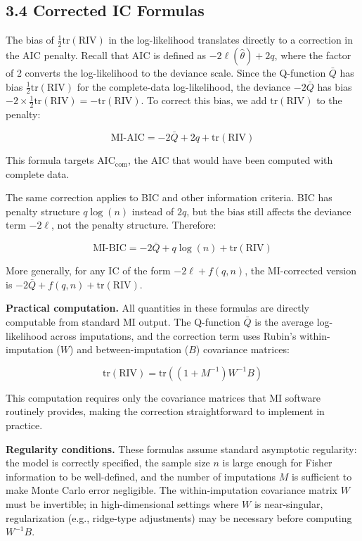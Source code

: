 \documentclass[
]{article}
\begin{document}
\subsection{3.4 Corrected IC Formulas}\label{corrected-ic-formulas}

The bias of \(\frac{1}{2}\text{tr}(\text{RIV})\) in the log-likelihood
translates directly to a correction in the AIC penalty. Recall that AIC
is defined as \(-2\ell(\hat{\theta}) + 2q\), where the factor of 2
converts the log-likelihood to the deviance scale. Since the Q-function
\(\bar{Q}\) has bias \(\frac{1}{2}\text{tr}(\text{RIV})\) for the
complete-data log-likelihood, the deviance \(-2\bar{Q}\) has bias
\(-2 \times \frac{1}{2}\text{tr}(\text{RIV}) = -\text{tr}(\text{RIV})\).
To correct this bias, we add \(\text{tr}(\text{RIV})\) to the penalty:

\[\text{MI-AIC} = -2\bar{Q} + 2q + \text{tr}(\text{RIV})\]

This formula targets \(\text{AIC}_{\text{com}}\), the AIC that would
have been computed with complete data.

The same correction applies to BIC and other information criteria. BIC
has penalty structure \(q\log(n)\) instead of \(2q\), but the bias still
affects the deviance term \(-2\ell\), not the penalty structure.
Therefore:

\[\text{MI-BIC} = -2\bar{Q} + q\log(n) + \text{tr}(\text{RIV})\]

More generally, for any IC of the form \(-2\ell + f(q, n)\), the
MI-corrected version is \(-2\bar{Q} + f(q,n) + \text{tr}(\text{RIV})\).

\textbf{Practical computation.} All quantities in these formulas are
directly computable from standard MI output. The Q-function \(\bar{Q}\)
is the average log-likelihood across imputations, and the correction
term uses Rubin's within-imputation (\(W\)) and between-imputation
(\(B\)) covariance matrices:

\[\text{tr}(\text{RIV}) = \text{tr}\left((1 + M^{-1})W^{-1}B\right)\]

This computation requires only the covariance matrices that MI software
routinely provides, making the correction straightforward to implement
in practice.

\textbf{Regularity conditions.} These formulas assume standard
asymptotic regularity: the model is correctly specified, the sample size
\(n\) is large enough for Fisher information to be well-defined, and the
number of imputations \(M\) is sufficient to make Monte Carlo error
negligible. The within-imputation covariance matrix \(W\) must be
invertible; in high-dimensional settings where \(W\) is near-singular,
regularization (e.g., ridge-type adjustments) may be necessary before
computing \(W^{-1}B\).
\end{document}
